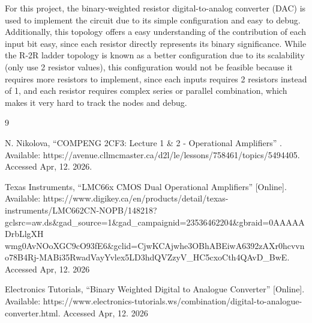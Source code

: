 \documentclass[12pt]{article}
\begin{document}
    For this project, the binary-weighted resistor digital-to-analog converter (DAC) is used to implement the circuit due to its simple configuration and easy to debug. Additionally, this topology offers a easy understanding of the contribution of each input bit easy, since each resistor directly represents its binary significance. While the R-2R ladder topology is known as a better configuration due to its scalability (only use 2 resistor values), this configuration would not be feasible because it requires more resistors to implement, since each inputs requires 2 resistors instead of 1, and each resistor requires complex series or parallel combination, which makes it very hard to track the nodes and debug. 

    \newpage
    \begin{thebibliography}{9}

        N. Nikolova, ``COMPENG 2CF3: Lecture 1 \& 2 - Operational Amplifiers'' 
        . Available: https://avenue.cllmcmaster.ca/d2l/le/lessons/758461/topics/5494405. Accessed Apr, 12. 2026.

        Texas Instruments, ``LMC66x CMOS Dual Operational Amplifiers'' 
        [Online]. Available: https://www.digikey.ca/en/products/detail/texas-instruments/LMC662CN-NOPB/148218?gclsrc=aw.ds\&gad\_source=1\&gad\_campaignid=23536462204\&gbraid=0AAAAADrbLlgXH \\ wmg0AvNOoXGC9cO93fE6\&gclid=CjwKCAjwhe3OBhABEiwA6392zAXr0hcvvno78B4Rj-MABi35RwadVayYvlex5LD3hdQVZzyV\_HC5cxoCth4QAvD\_BwE. Accessed Apr, 12. 2026

    Electronics Tutorials, ``Binary Weighted Digital to Analogue Converter'' 
    [Online]. Available: https://www.electronics-tutorials.ws/combination/digital-to-analogue-converter.html. Accessed Apr, 12. 2026

    \end{thebibliography} 
\end{document}
